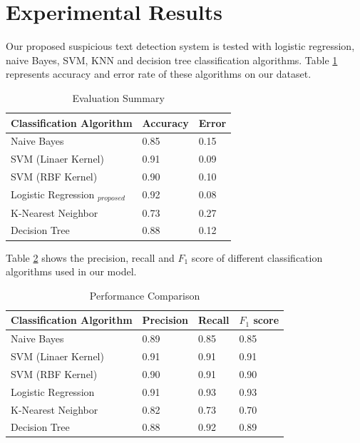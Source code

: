 \section{\textbf{Experimental Results}}
Our proposed suspicious text detection system is tested with logistic regression, naive Bayes, SVM,  KNN and decision tree classification algorithms. Table \ref{AE} represents accuracy and error rate of these algorithms on our dataset.
\renewcommand{\arraystretch}{1.5}
\begin{table}[h!]
\begin{center}
\caption{Evaluation Summary}
\begin{tabular}{||m{4.65cm} | m{1.4cm}| m{1.35cm}||}
\hline
     Classification Algorithm & Accuracy  & Error  \\
\hline
    Naive Bayes \cite{yoo2015classification} & 0.85 & 0.15\\
\hline 
    SVM (Linaer Kernel) \cite{wei2012text} & 0.91 & 0.09\\
\hline 
    SVM (RBF Kernel) \cite{villmann2017can}& 0.90 & 0.10\\
\hline 
    Logistic Regression\cite{sharma2015active} $_{proposed}$ & 0.92 & 0.08\\
\hline
    K-Nearest Neighbor \cite{harisinghaney2014text}& 0.73 & 0.27\\
\hline
    Decision Tree \cite{chavan2014survey}& 0.88 & 0.12\\
\hline
\end{tabular}
\label{AE}
\end{center}
\end{table}
\par
Table \ref{prr} shows the precision, recall and $F_1$ score of different classification algorithms used in our model.

\begin{table}[h!]
\begin{center}
\caption{Performance Comparison}
\begin{tabular}{||m{3.6cm} | m{1.25cm}| m{1.2cm}| m{1.3cm}||}
\hline
     Classification Algorithm & Precision & Recall & $F_1$ score \\
\hline
    Naive Bayes & 0.89 & 0.85 & 0.85\\
\hline 
    SVM (Linaer Kernel) & 0.91 & 0.91 & 0.91\\
\hline 
    SVM (RBF Kernel) & 0.90 & 0.91 & 0.90\\
\hline 
    Logistic Regression & 0.91 & 0.93 & 0.93\\
\hline
    K-Nearest Neighbor & 0.82 & 0.73 & 0.70\\
\hline
    Decision Tree & 0.88 & 0.92 & 0.89\\
\hline
\end{tabular}
\label{prr}
\end{center}
\end{table}

